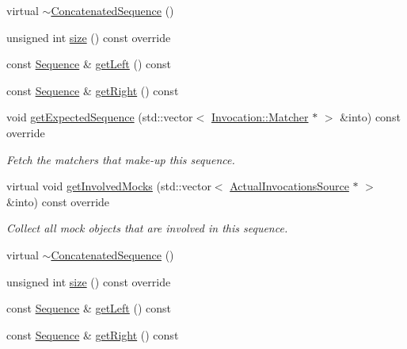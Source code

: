 \begin{DoxyCompactItemize}
virtual \mbox{\hyperlink{classfakeit_1_1ConcatenatedSequence_a22346ae8c3c2af91f26144338750be25}{$\sim$\+Concatenated\+Sequence}} ()
\item 
unsigned int \mbox{\hyperlink{classfakeit_1_1ConcatenatedSequence_aa1dba1b0274b30626ceab3a743c8105a}{size}} () const override
\item 
const \mbox{\hyperlink{classfakeit_1_1Sequence}{Sequence}} \& \mbox{\hyperlink{classfakeit_1_1ConcatenatedSequence_aee102fbcc892783441a36082e1a22789}{get\+Left}} () const
\item 
const \mbox{\hyperlink{classfakeit_1_1Sequence}{Sequence}} \& \mbox{\hyperlink{classfakeit_1_1ConcatenatedSequence_a7b1ed9161c972e43fdf2e4cfecbe5bd7}{get\+Right}} () const
\item 
void \mbox{\hyperlink{classfakeit_1_1ConcatenatedSequence_a176b1d4dac2e552f646c2c3ce98f0d1f}{get\+Expected\+Sequence}} (std\+::vector$<$ \mbox{\hyperlink{structfakeit_1_1Invocation_1_1Matcher}{Invocation\+::\+Matcher}} $\ast$ $>$ \&into) const override
\begin{DoxyCompactList}\small\item\em Fetch the matchers that make-\/up this sequence. \end{DoxyCompactList}\item 
virtual void \mbox{\hyperlink{classfakeit_1_1ConcatenatedSequence_a3b475e68ab4f750f2d4946e4777ebe30}{get\+Involved\+Mocks}} (std\+::vector$<$ \mbox{\hyperlink{structfakeit_1_1ActualInvocationsSource}{Actual\+Invocations\+Source}} $\ast$ $>$ \&into) const override
\begin{DoxyCompactList}\small\item\em Collect all mock objects that are involved in this sequence. \end{DoxyCompactList}\item 
virtual \mbox{\hyperlink{classfakeit_1_1ConcatenatedSequence_a22346ae8c3c2af91f26144338750be25}{$\sim$\+Concatenated\+Sequence}} ()
\item 
unsigned int \mbox{\hyperlink{classfakeit_1_1ConcatenatedSequence_aa1dba1b0274b30626ceab3a743c8105a}{size}} () const override
\item 
const \mbox{\hyperlink{classfakeit_1_1Sequence}{Sequence}} \& \mbox{\hyperlink{classfakeit_1_1ConcatenatedSequence_aee102fbcc892783441a36082e1a22789}{get\+Left}} () const
\item 
const \mbox{\hyperlink{classfakeit_1_1Sequence}{Sequence}} \& \mbox{\hyperlink{classfakeit_1_1ConcatenatedSequence_a7b1ed9161c972e43fdf2e4cfecbe5bd7}{get\+Right}} () const

\end{DoxyCompactItemize}
